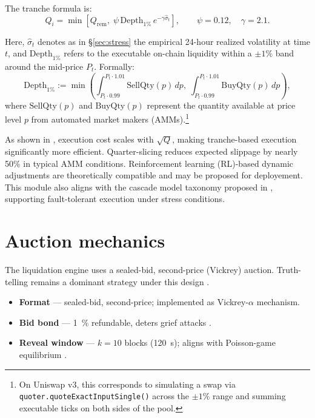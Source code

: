 \documentclass[11pt]{article}
\newcommand{\secref}[1]{§\hyperref[#1]{\ref*{#1}}}
\begin{document}
The tranche formula is:
\begin{equation}\label{eq:tranche}
Q_i = \min \left[ Q_{\text{rem}},\;
                  \psi\,\text{Depth}_{1\%}\,e^{-\gamma \widehat{\sigma}_t} \right],
\qquad \psi = 0.12,\quad \gamma = 2.1.
\end{equation}

Here, \( \widehat{\sigma}_t \) denotes as in \secref{sec:stress} the empirical 24-hour realized volatility at time \( t \), and \( \text{Depth}_{1\%} \) refers to the executable on-chain liquidity within a \(\pm 1\%\) band around the mid-price \( P_t \). Formally:
\[
\text{Depth}_{1\%} := \min \left(
\int_{P_t \cdot 0.99}^{P_t \cdot 1.01} \text{SellQty}(p)\,dp,\;
\int_{P_t \cdot 0.99}^{P_t \cdot 1.01} \text{BuyQty}(p)\,dp
\right),
\]
where \( \text{SellQty}(p) \) and \( \text{BuyQty}(p) \) represent the quantity available at price level \( p \) from automated market makers (AMMs).\footnote{On Uniswap v3, this corresponds to simulating a swap via \texttt{quoter.quoteExactInputSingle()} across the \(\pm 1\%\) range and summing executable ticks on both sides of the pool.}

As shown in \textcite{almgren2000optimal}, execution cost scales with \( \sqrt{Q} \), making tranche-based execution significantly more efficient. Quarter-slicing reduces expected slippage by nearly 50\% in typical AMM conditions.  
Reinforcement learning (RL)-based dynamic adjustments \parencite{zhang2023adaptive} are theoretically compatible and may be proposed for deployement.  
This module also aligns with the cascade model taxonomy proposed in \textcite{zhao2025reliability}, supporting fault-tolerant execution under stress conditions.





\section{Auction mechanics}
\label{sec:auction}

The liquidation engine uses a sealed-bid, second-price (Vickrey) auction. Truth-telling remains a dominant strategy under this design \parencite{myerson1994bayesian}.

\begin{itemize}[leftmargin=*]
\item \textbf{Format} — sealed-bid, second-price; implemented as Vickrey-$\alpha$ mechanism.
\item \textbf{Bid bond} — \SI{1}{\percent} refundable, deters grief attacks \parencite{tian2025defi}.
\item \textbf{Reveal window} — $k{=}10$ blocks (\SI{120}{\second}); aligns with Poisson-game equilibrium \parencite{meroni2017games}.
\end{itemize}
\end{document}
